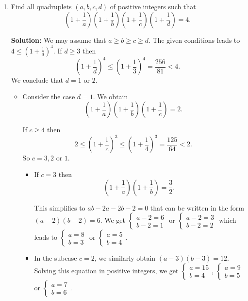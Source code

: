 \documentclass{article}
\newcommand{\solution}[1]{%
\ifsolutions%
    \textbf{Solution: } #1
\fi
}
\begin{document}
\begin{enumerate}
\item Find all quadruplets $(a, b, c, d)$ of positive integers such that
\[
    \left( 1 + \frac{1}{a} \right) \left( 1 + \frac{1}{b} \right) \left( 1 + \frac{1}{c} \right) \left( 1 + \frac{1}{d} \right) = 4.
\]

\solution{We may assume that $a \geq b \geq c \geq d$. The given conditions leads to $4 \leq {\left( 1 + \frac{1}{d} \right)}^4$. If $d \geq 3$ then
\[
    {\left( 1 + \frac{1}{d} \right)}^4 \leq {\left( 1 + \frac{1}{3} \right)}^4 = \frac{256}{81} < 4.
\]
We conclude that $d = 1$ or $2$.

\begin{itemize}

\item Consider the case $d = 1$. We obtain
\[
    \left( 1 + \frac{1}{a} \right) \left( 1 + \frac{1}{b} \right) \left( 1 + \frac{1}{c} \right) = 2.
\]

If $c \geq 4$ then
\[
    2 \leq {\left( 1 + \frac{1}{c} \right)}^3 \leq {\left( 1 + \frac{1}{4} \right)}^3 = \frac{125}{64} < 2.
\]
So $c = 3, 2$ or $1$.
\begin{itemize}

\item If $c = 3$ then
\[
    \left( 1 + \frac{1}{a} \right) \left( 1 + \frac{1}{b} \right) = \frac{3}{2}.
\]

This simplifies to $ab - 2a - 2b - 2 = 0$ that can be written in the form $(a - 2)(b - 2) = 6$. We get $\begin{cases} a - 2 = 6 \\ b - 2 = 1 \end{cases}$ or $\begin{cases} a - 2 = 3 \\ b - 2 = 2 \end{cases}$ which leads to $\begin{cases} a = 8 \\ b = 3 \end{cases}$ or $\begin{cases} a = 5 \\ b = 4 \end{cases}$.

\item In the subcase $c = 2$, we similarly obtain $(a - 3)(b - 3) = 12$. Solving this equation in positive integers, we get $\begin{cases} a = 15 \\ b = 4 \end{cases}$, $\begin{cases} a = 9 \\ b = 5 \end{cases}$ or $\begin{cases} a = 7 \\ b = 6 \end{cases}$.


\end{itemize}
\end{itemize}}
\end{enumerate}
\end{document}
